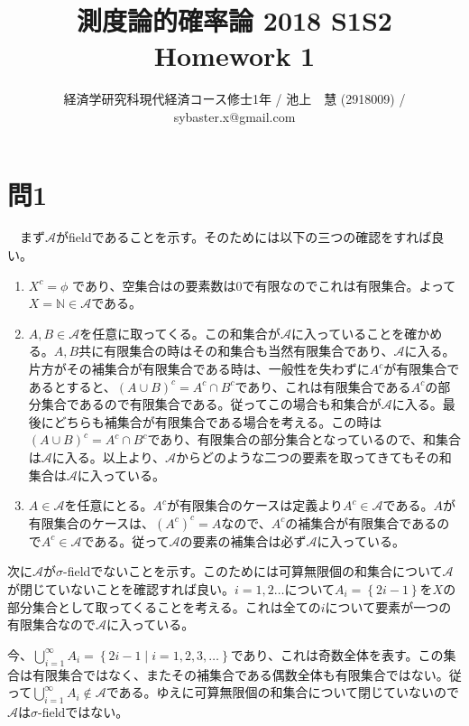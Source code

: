 \documentclass{article}
\begin{document}
\title{測度論的確率論 2018 S1S2 \\ 
Homework 1}
\author{経済学研究科現代経済コース修士1年 / 池上　慧 (2918009) / sybaster.x@gmail.com}
\maketitle

\section{問1}
　まず$\mathcal{A}$がfieldであることを示す。そのためには以下の三つの確認をすれば良い。

\begin{enumerate}
	\item $X^c = \phi$ であり、空集合はの要素数は$0$で有限なのでこれは有限集合。よって$X = \mathbb{N} \in \mathcal{A}$である。
	\item $A, B \in \mathcal{A}$を任意に取ってくる。この和集合が$\mathcal{A}$に入っていることを確かめる。$A, B$共に有限集合の時はその和集合も当然有限集合であり、$\mathcal{A}$に入る。片方がその補集合が有限集合である時は、一般性を失わずに$A^c$が有限集合であるとすると、$(A\cup B)^c = A^c \cap B^c$であり、これは有限集合である$A^c$の部分集合であるので有限集合である。従ってこの場合も和集合が$\mathcal{A}$に入る。最後にどちらも補集合が有限集合である場合を考える。この時は$(A\cup B)^c = A^c \cap B^c$であり、有限集合の部分集合となっているので、和集合は$\mathcal{A}$に入る。以上より、$\mathcal{A}$からどのような二つの要素を取ってきてもその和集合は$\mathcal{A}$に入っている。
	\item $A \in \mathcal{A}$を任意にとる。$A^c$が有限集合のケースは定義より$A^c \in \mathcal{A}$である。$A$が有限集合のケースは、$(A^c)^c = A$なので、$A^c$の補集合が有限集合であるので$A^c \in \mathcal{A}$である。従って$\mathcal{A}$の要素の補集合は必ず$\mathcal{A}$に入っている。
\end{enumerate}

次に$\mathcal{A}$が$\sigma$-fieldでないことを示す。このためには可算無限個の和集合について$\mathcal{A}$が閉じていないことを確認すれば良い。$i = 1, 2 \dots$について$A_i = \left\{2i -1\right\}$を$X$の部分集合として取ってくることを考える。これは全ての$i$について要素が一つの有限集合なので$\mathcal{A}$に入っている。

今、$\bigcup_{i = 1}^{\infty} A_i = \left\{ 2i-1 \mid i = 1,2,3, \dots \right\}$であり、これは奇数全体を表す。この集合は有限集合ではなく、またその補集合である偶数全体も有限集合ではない。従って$\bigcup_{i = 1}^{\infty} A_i \not\in \mathcal{A}$である。ゆえに可算無限個の和集合について閉じていないので$\mathcal{A}$は$\sigma$-fieldではない。
\end{document}

